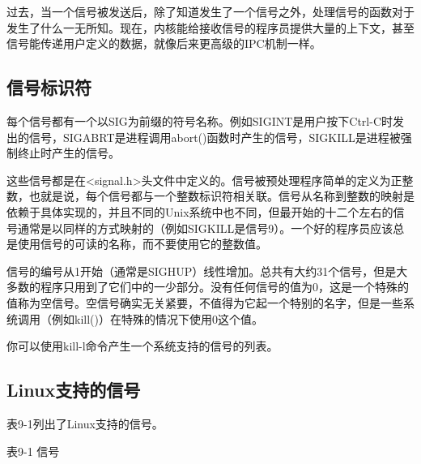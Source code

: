 过去，当一个信号被发送后，除了知道发生了一个信号之外，处理信号的函数对于发生了什么一无所知。现在，内核能给接收信号的程序员提供大量的上下文，甚至信号能传递用户定义的数据，就像后来更高级的IPC机制一样。

\subsection{信号标识符}

每个信号都有一个以SIG为前缀的符号名称。例如SIGINT是用户按下Ctrl-C时发出的信号，SIGABRT是进程调用abort()函数时产生的信号，SIGKILL是进程被强制终止时产生的信号。

这些信号都是在<signal.h>头文件中定义的。信号被预处理程序简单的定义为正整数，也就是说，每个信号都与一个整数标识符相关联。信号从名称到整数的映射是依赖于具体实现的，并且不同的Unix系统中也不同，但最开始的十二个左右的信号通常是以同样的方式映射的（例如SIGKILL是信号9）。一个好的程序员应该总是使用信号的可读的名称，而不要使用它的整数值。

信号的编号从1开始（通常是SIGHUP）线性增加。总共有大约31个信号，但是大多数的程序只用到了它们中的一少部分。没有任何信号的值为0，这是一个特殊的值称为空信号。空信号确实无关紧要，不值得为它起一个特别的名字，但是一些系统调用（例如kill()）在特殊的情况下使用0这个值。

你可以使用kill-l命令产生一个系统支持的信号的列表。

\subsection{Linux支持的信号}

表9-1列出了Linux支持的信号。

表9-1 信号

